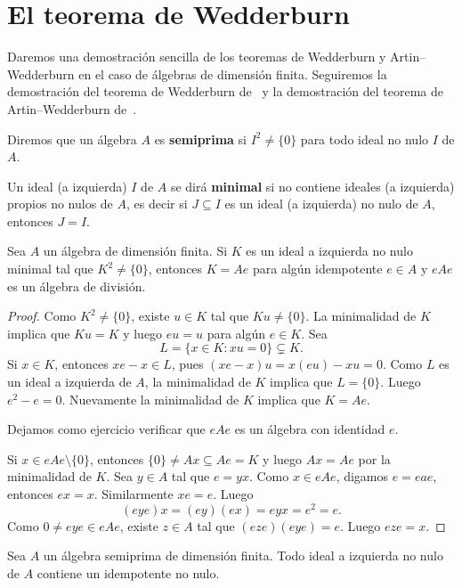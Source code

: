 \chapter{El teorema de Wedderburn}

Daremos una demostración sencilla de los teoremas de Wedderburn y Artin--Wedderburn 
en el caso de álgebras de dimensión finita. 
Seguiremos la demostración del teorema de Wedderburn de~\cite{MR184969} y 
la demostración del teorema de Artin--Wedderburn de~\cite{MR1244013}.  

\begin{definition}
Diremos que un álgebra $A$ es \textbf{semiprima} si $I^2\ne\{0\}$ para todo ideal no nulo $I$ de $A$.	
\end{definition}

Un ideal (a izquierda) $I$ de $A$ se dirá \textbf{minimal} si no contiene ideales (a izquierda) 
propios no nulos de $A$, es decir si $J\subseteq I$ es un ideal (a izquierda) no nulo de $A$, entonces
$J=I$. 

\begin{lemma}[Brauer]
\label{lem:Brauer1}
	Sea $A$ un álgebra de dimensión finita. Si $K$ es un ideal a izquierda no nulo minimal tal que
	$K^2\ne\{0\}$, entonces $K=Ae$ para algún idempotente $e\in A$ y $eAe$ es un álgebra de división.
\end{lemma}

\begin{proof}
Como $K^2\ne\{0\}$, existe $u\in K$ tal que $Ku\ne\{0\}$. La minimalidad de $K$ implica que $Ku=K$ y luego
$eu=u$ para algún $e\in K$. 
Sea 
\[
L=\{x\in K:xu=0\}\subsetneq K.
\] 
Si $x\in K$, entonces $xe-x\in L$, pues $(xe-x)u=x(eu)-xu=0$. 
Como $L$ es un ideal a izquierda de $A$, la minimalidad de $K$ implica que
$L=\{0\}$. Luego $e^2-e=0$. 
Nuevamente la minimalidad de $K$ implica que $K=Ae$. 

Dejamos como ejercicio
verificar que $eAe$ es un álgebra con identidad $e$. 

Si $x\in eAe\setminus\{0\}$, entonces $\{0\}\ne Ax\subseteq Ae=K$ y luego
$Ax=Ae$ por la minimalidad de $K$. Sea $y\in A$ tal que $e=yx$. 
Como $x\in eAe$, digamos $e=eae$, entonces $ex=x$. Similarmente $xe=e$.
Luego
\[
(eye)x=(ey)(ex)=eyx=e^2=e.
\]
Como $0\ne eye\in eAe$, existe $z\in A$ tal que $(eze)(eye)=e$. Luego $eze=x$. 
\end{proof}

\begin{lemma}
\label{lem:Brauer2}
Sea $A$ un álgebra semiprima de dimensión finita. 
Todo ideal a izquierda no nulo de $A$ contiene 
un idempotente no nulo.	
\end{lemma}

